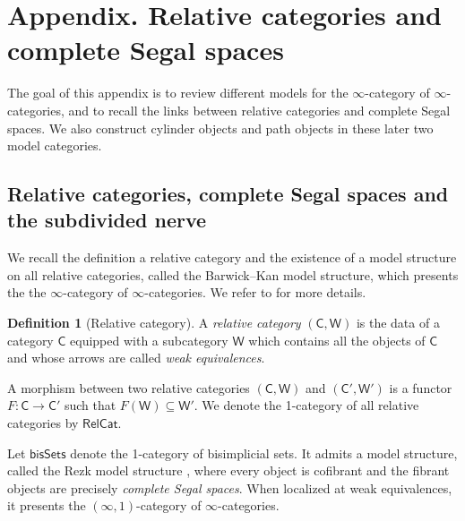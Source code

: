 \documentclass{proc-l}
\theoremstyle{plain}
\theoremstyle{definition}
\newtheorem{definition}[{theorem}]{Definition}
\theoremstyle{remark}
\begin{document}
\vspace{1pc}
\renewcommand{\thesection}{A}

\section{Appendix. Relative categories and complete Segal spaces}%
\label{Section:A}\label{Appendix A: Relative categories}

\vspace{2.5pc}

The goal of this appendix is to review different models for the $\infty$-category of $\infty$-categories, and to recall the links between relative categories and complete Segal spaces. We also construct cylinder objects and path objects in these later two model categories.

\subsection{Relative categories, complete Segal spaces and the subdivided nerve}%
\label{Section:A.1} We recall the definition a relative category and the existence of a model structure on all relative categories, called the Barwick--Kan model structure, which presents the the $\infty$-category of $\infty$-categories. We refer to \cite{BarwickKan1} for more details.

\begin{definition}[{Relative category}]%
\label{Definition:A.1}
A \textit{relative category} $(\mathsf{C},\mathsf{W})$ is the data of a category $\mathsf{C}$ equip\-ped with a subcategory $\mathsf{W}$ which contains all the objects of $\mathsf{C}$ and whose arrows are called \textit{weak equivalences}.
\end{definition}

A morphism between two relative categories $(\mathsf{C},\mathsf{W})$ and $(\mathsf{C}',\mathsf{W}')$ is a functor $F: \mathsf{C} \longrightarrow \mathsf{C}'$ such that $F(\mathsf{W}) \subseteq \mathsf{W}'$. We denote the 1-category of all relative categories by $\mathsf{RelCat}$.

Let $\mathsf{bisSets}$ denote the 1-category of bisimplicial sets. It admits a model structure, called the Rezk model structure \cite{Rezk01}, where every object is cofibrant and the fibrant objects are precisely \textit{complete Segal spaces}. When localized at weak equivalences, it presents the $(\infty,1)$-category of $\infty$-categories.
\end{document}
